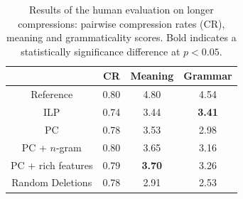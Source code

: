 \documentclass[11pt]{article}
\begin{document}
 \begin{table}
   \small
   \begin{center}
     \begin{tabular}{|c|c|c|c|}
       \hline
       & CR & Meaning & Grammar \\
       \hline
       Reference & 0.80 &  4.80 & 4.54 \\
       \hline
       ILP & 0.74 & 3.44 & {\bf 3.41} \\
       \hline
       \hline
       PC & 0.78 & 3.53 & 2.98 \\
       \hline
       PC + $n$-gram & 0.80 & 3.65 & 3.16 \\
       PC  + rich features & 0.79 & {\bf 3.70} & 3.26 \\
       \hline
       \hline
       Random Deletions & 0.78 & 2.91 & 2.53 \\
       \hline
     \end{tabular}
   \end{center}
   \normalsize
   \caption{Results of the human evaluation on longer compressions:
     pairwise compression rates (CR), meaning and grammaticality scores. 
     Bold indicates a statistically significance difference at $p <
     0.05$.}
   \label{human_judgments}
 \end{table}
\end{document}
